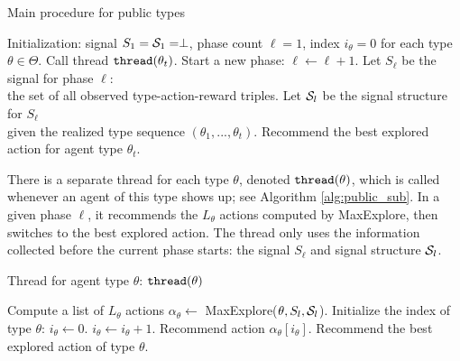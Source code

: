 \begin{algorithm}[t]
    \caption{Main procedure for public types }
    	\label{alg:public_main}
    \begin{algorithmic}[1]
    \STATE Initialization: signal $S_1 = \S_1 = \perp$,
             phase count $\ell = 1$, index $i_{\theta} = 0$ for each type $\theta \in \varTheta$.
		\IF {$\ell \leq |\A|\cdot |\varTheta|$}
		 \STATE {}
		\STATE Call thread $\thread(\theta_t)$.
				\STATE Start a new phase: $\ell \leftarrow \ell + 1$.
				\STATE Let $S_\ell$ be the signal for phase $\ell$: \\
                 \TAB the set of all observed type-action-reward triples.
        \STATE Let $\S_\ell$ be the signal structure for $S_\ell$\\
         \TAB given the realized type sequence $(\theta_1,...,\theta_t)$.
			\ENDIF
		\ELSE
			\STATE {}
			\STATE Recommend the best explored action for agent type $\theta_t$.
		\ENDIF
	\ENDFOR
     \end{algorithmic}
\end{algorithm}

There is a separate thread for each type $\theta$, denoted $\thread(\theta)$,  which is called whenever an agent of this type shows up; see Algorithm \ref{alg:public_sub}. In a given phase $\ell$, it recommends the $L_{\theta}$ actions computed by MaxExplore, then switches to the best explored action. The thread only uses the information collected before the current phase starts: the signal $S_\ell$ and signal structure $\S_\ell$.

 \begin{algorithm}[h]
    \caption{Thread for agent type $\theta$: $\thread(\theta)$ }
    	\label{alg:public_sub}
    \begin{algorithmic}[1]
			\STATE Compute a list of $L_{\theta}$ actions $\alpha_{\theta} \leftarrow $ MaxExplore($\theta, S_\ell, \S_\ell$).
			\STATE Initialize the index of type $\theta$: $i_{\theta} \leftarrow 0$.
		\ENDIF
		\STATE $i_{\theta} \leftarrow i_{\theta} + 1$.
			\STATE Recommend action $\alpha_{\theta} [i_{\theta}]$.
		\ELSE
			\STATE Recommend the best explored action of type $\theta$.
		\ENDIF
     \end{algorithmic}
\end{algorithm}

